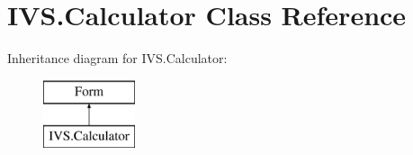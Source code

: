 \hypertarget{class_i_v_s_1_1_calculator}{}\section{I\+V\+S.\+Calculator Class Reference}
\label{class_i_v_s_1_1_calculator}
Inheritance diagram for I\+V\+S.\+Calculator\+:\begin{figure}[H]
\begin{center}
\leavevmode
\includegraphics[height=2.000000cm]{class_i_v_s_1_1_calculator}
\end{center}
\end{figure}
